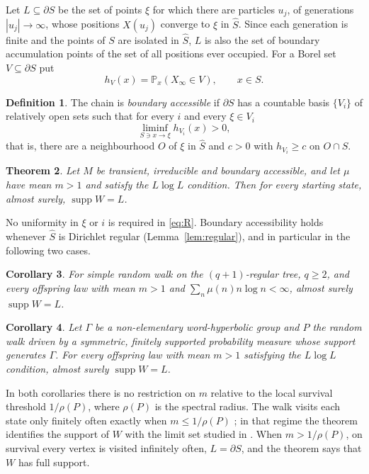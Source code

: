 \documentclass[11pt]{amsart}
\newtheorem{theorem}{Theorem}[section]
\newtheorem{corollary}[theorem]{Corollary}
\theoremstyle{definition}
\newtheorem{definition}[theorem]{Definition}
\theoremstyle{remark}
\numberwithin{equation}{section}
\newcommand{\Pp}{\mathbb P}
\newcommand{\1}{\mathbf 1}
\newcommand{\K}{\widehat S}
\newcommand{\bd}{\partial S}
\begin{document}
Let $L\subseteq\bd$ be the set of points $\xi$ for which there are particles $u_j$, of generations $|u_j|\to\infty$, whose positions $X(u_j)$ converge to $\xi$ in $\K$. Since each generation is finite and the points of $S$ are isolated in $\K$, $L$ is also the set of boundary accumulation points of the set of all positions ever occupied. For a Borel set $V\subseteq\bd$ put
\[
h_V(x)=\Pp_x(X_\infty\in V),\qquad x\in S.
\]

\begin{definition}\label{def:R}
The chain is \emph{boundary accessible} if $\bd$ has a countable basis $\{V_i\}$ of relatively open sets such that for every $i$ and every $\xi\in V_i$
\begin{equation}\label{eq:R}
\liminf_{S\ni x\to\xi}h_{V_i}(x)>0,
\end{equation}
that is, there are a neighbourhood $O$ of $\xi$ in $\K$ and $c>0$ with $h_{V_i}\ge c$ on $O\cap S$.
\end{definition}

\begin{theorem}\label{thm:main}
Let $M$ be transient, irreducible and boundary accessible, and let $\mu$ have mean $m>1$ and satisfy the $L\log L$ condition. Then for every starting state, almost surely, $\operatorname{supp}W=L$.
\end{theorem}

No uniformity in $\xi$ or $i$ is required in \eqref{eq:R}. Boundary accessibility holds whenever $\K$ is Dirichlet regular (Lemma~\ref{lem:regular}), and in particular in the following two cases.

\begin{corollary}\label{cor:tree}
For simple random walk on the $(q+1)$-regular tree, $q\ge2$, and every offspring law with mean $m>1$ and $\sum_n\mu(n)n\log n<\infty$, almost surely $\operatorname{supp}W=L$.
\end{corollary}

\begin{corollary}\label{cor:hyp}
Let $\Gamma$ be a non-elementary word-hyperbolic group and $P$ the random walk driven by a symmetric, finitely supported probability measure whose support generates $\Gamma$. For every offspring law with mean $m>1$ satisfying the $L\log L$ condition, almost surely $\operatorname{supp}W=L$.
\end{corollary}

In both corollaries there is no restriction on $m$ relative to the local survival threshold $1/\rho(P)$, where $\rho(P)$ is the spectral radius. The walk visits each state only finitely often exactly when $m\le1/\rho(P)$ \cite{BP,GM}; in that regime the theorem identifies the support of $W$ with the limit set studied in \cite{LS,SWX}. When $m>1/\rho(P)$, on survival every vertex is visited infinitely often, $L=\bd$, and the theorem says that $W$ has full support.
\end{document}
